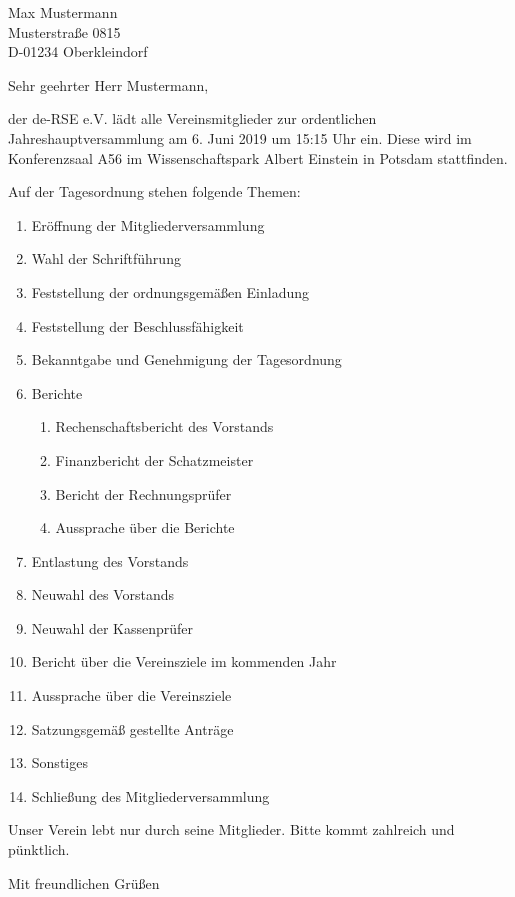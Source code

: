 \documentclass[../Vorlagen/de-RSE_Brief,a4paper]{scrlttr2}
\begin{document}

\begin{letter}{
    Max Mustermann\\
    Musterstraße 0815\\
    D-01234 Oberkleindorf
}
\opening{Sehr geehrter Herr Mustermann,}

der de-RSE e.V. lädt alle Vereinsmitglieder zur ordentlichen Jahreshauptversammlung am 6. Juni 2019 um 15:15 Uhr ein.
Diese wird im Konferenzsaal A56 im Wissenschaftspark Albert Einstein in Potsdam stattfinden.

\vspace{2em}
Auf der Tagesordnung stehen folgende Themen:
\begin{enumerate}
\setlength\itemsep{0em}
\item Eröffnung der Mitgliederversammlung
\item Wahl der Schriftführung
\item Feststellung der ordnungsgemäßen Einladung
\item Feststellung der Beschlussfähigkeit
\item Bekanntgabe und Genehmigung der Tagesordnung
\item Berichte
\begin{enumerate}
 \item Rechenschaftsbericht des Vorstands
 \item Finanzbericht der Schatzmeister
 \item Bericht der Rechnungsprüfer
 \item Aussprache über die Berichte
\end{enumerate}
\item Entlastung des Vorstands
\item Neuwahl des Vorstands
\item Neuwahl der Kassenprüfer
\item Bericht über die Vereinsziele im kommenden Jahr
\item Aussprache über die Vereinsziele
\item Satzungsgemäß gestellte Anträge
\item Sonstiges
\item Schließung des Mitgliederversammlung
\end{enumerate}

Unser Verein lebt nur durch seine Mitglieder. Bitte kommt zahlreich und pünktlich.

\closing{Mit freundlichen Grüßen}
\end{letter}
\end{document}
